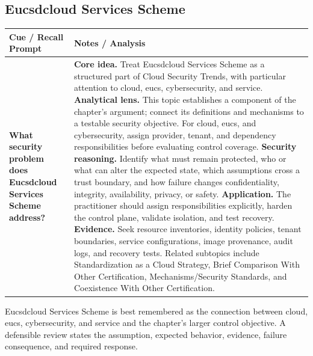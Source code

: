 \documentclass[11pt]{article}
\newcommand{\CornellHeader}{%
\rowcolor{Navy}\color{white}\bfseries Cue / Recall Prompt & \color{white}\bfseries Notes / Analysis\\\hline}
\newcommand{\CornellRow}[2]{%
\cellcolor{CueGray}\RaggedRight\textbf{#1} & \RaggedRight #2\\\hline}
\begin{document}
\subsection*{Eucsdcloud Services Scheme}
\begin{longtable}{>{\RaggedRight\arraybackslash}p{}|>{\RaggedRight\arraybackslash}p{}}
\CornellHeader
\CornellRow{What security problem does Eucsdcloud Services Scheme address?}{\textbf{Core idea.} Treat Eucsdcloud Services Scheme as a structured part of Cloud Security Trends, with particular attention to cloud, eucs, cybersecurity, and service. \textbf{Analytical lens.} This topic establishes a component of the chapter's argument; connect its definitions and mechanisms to a testable security objective. For cloud, eucs, and cybersecurity, assign provider, tenant, and dependency responsibilities before evaluating control coverage. \textbf{Security reasoning.} Identify what must remain protected, who or what can alter the expected state, which assumptions cross a trust boundary, and how failure changes confidentiality, integrity, availability, privacy, or safety. \textbf{Application.} The practitioner should assign responsibilities explicitly, harden the control plane, validate isolation, and test recovery. \textbf{Evidence.} Seek resource inventories, identity policies, tenant boundaries, service configurations, image provenance, audit logs, and recovery tests. Related subtopics include Standardization as a Cloud Strategy, Brief Comparison With Other Certification, Mechanisms/Security Standards, and Coexistence With Other Certification.}
\end{longtable}
\begin{topicsummary}
Eucsdcloud Services Scheme is best remembered as the connection between cloud, eucs, cybersecurity, and service and the chapter's larger control objective. A defensible review states the assumption, expected behavior, evidence, failure consequence, and required response.
\end{topicsummary}
\end{document}
